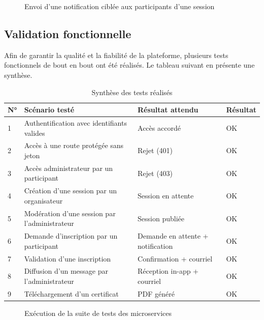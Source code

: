 \begin{figure}[H]\centering
  \caption{Envoi d'une notification ciblée aux participants d'une session}\label{fig:com-target}
\end{figure}



\subsection{Validation fonctionnelle}
Afin de garantir la qualité et la fiabilité de la plateforme, plusieurs tests fonctionnels de
bout en bout ont été réalisés. Le tableau suivant en présente une synthèse.

\begin{table}[H]\centering\renewcommand{\arraystretch}{1.3}
\begin{tabular}{|p{0.9cm}|p{7.5cm}|p{3cm}|p{1.8cm}|}\hline
\rowcolor{gray!15}\textbf{N°} & \textbf{Scénario testé} & \textbf{Résultat attendu} & \textbf{Résultat} \\ \hline
1 & Authentification avec identifiants valides & Accès accordé & OK \\ \hline
2 & Accès à une route protégée sans jeton & Rejet (401) & OK \\ \hline
3 & Accès administrateur par un participant & Rejet (403) & OK \\ \hline
4 & Création d'une session par un organisateur & Session en attente & OK \\ \hline
5 & Modération d'une session par l'administrateur & Session publiée & OK \\ \hline
6 & Demande d'inscription par un participant & Demande en attente + notification & OK \\ \hline
7 & Validation d'une inscription & Confirmation + courriel & OK \\ \hline
8 & Diffusion d'un message par l'administrateur & Réception in-app + courriel & OK \\ \hline
9 & Téléchargement d'un certificat & PDF généré & OK \\ \hline
\end{tabular}
\caption{Synthèse des tests réalisés}\label{tab:tests}
\end{table}

\begin{figure}[H]\centering
  \caption{Exécution de la suite de tests des microservices}\label{fig:tests-run}
\end{figure}

